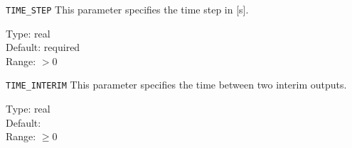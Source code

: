 \begin{keydescription}{\texttt{TIME\_STEP}}
This parameter specifies the time step in [s].
\begin{keytab}
   Type:    \> real \\
   Default: \> required \\
   Range:   \> $> 0$
\end{keytab}
\end{keydescription}

\begin{keydescription}{\texttt{TIME\_INTERIM}}
This parameter specifies the time between two interim outputs.
\begin{keytab}
   Type:    \> real \\
   Default:  \\
   Range:   \> $\ge 0$
\end{keytab}
\end{keydescription}

